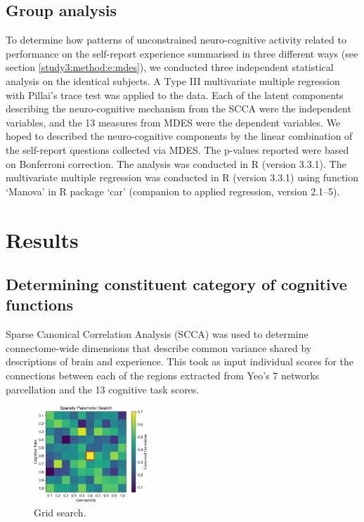 \subsection{Group analysis}
\label{study3:method:g}

To determine how patterns of unconstrained neuro-cognitive activity related to performance on the self-report experience summarised in three different ways (see section \ref{study3:method:e:mdes}),
we conducted three independent statistical analysis on the identical subjects. A Type III multivariate multiple regression with Pillai's trace test was applied to the data. Each of the latent components describing the neuro-cognitive mechanism from the SCCA were the independent variables, and the 13 measures from MDES were the dependent variables. We hoped to described the neuro-cognitive components by the linear combination of the self-report questions collected via MDES. The p-values reported were based on Bonferroni correction. The analysis was conducted in R (version 3.3.1). The multivariate multiple regression was conducted in R (version 3.3.1) using function ‘Manova’ in R package ‘car’ (companion to applied regression, version 2.1–5).

\section{Results}
\label{study3:results}

\subsection{Determining constituent category of cognitive functions}

Sparse Canonical Correlation Analysis (SCCA) was used to determine connectome-wide dimensions that describe common variance shared by descriptions of brain and experience. This took as input individual scores for the connections between each of the regions extracted from Yeo’s 7 networks parcellation and the 13 cognitive task scores.

\begin{figure}
    \vspace{-10pt}
    \centering
    \includegraphics[width=0.38\textwidth]{study3/image/study3fig2.png}
	\caption{Grid search.}
	\label{fig:study3:fig2}
	\vspace{-20pt}
\end{figure}

